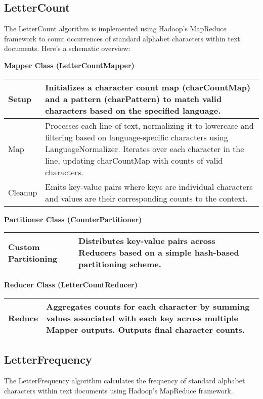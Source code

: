 \subsection{LetterCount}

The LetterCount algorithm is implemented using Hadoop's MapReduce framework to count occurrences of standard alphabet characters within text documents. Here’s a schematic overview:


\textbf{Mapper Class (LetterCountMapper)}
\begin{longtable}{|>{\raggedright\arraybackslash}p{}|>{\raggedright\arraybackslash}p{}|}
    \hline
    Setup & Initializes a character count map (charCountMap) and a pattern (charPattern) to match valid characters based on the specified language. \\
    \hline
    Map & Processes each line of text, normalizing it to lowercase and filtering based on language-specific characters using LanguageNormalizer. Iterates over each character in the line, updating charCountMap with counts of valid characters. \\
    \hline
    Cleanup & Emits key-value pairs where keys are individual characters and values are their corresponding counts to the context. \\
    \hline
\end{longtable}

\textbf{Partitioner Class (CounterPartitioner)}
\begin{longtable}{|>{\raggedright\arraybackslash}p{}|>{\raggedright\arraybackslash}p{}|}
    \hline
    Custom Partitioning & Distributes key-value pairs across Reducers based on a simple hash-based partitioning scheme. \\
    \hline
\end{longtable}

\textbf{Reducer Class (LetterCountReducer)}
\begin{longtable}{|>{\raggedright\arraybackslash}p{}|>{\raggedright\arraybackslash}p{}|}
    \hline
    Reduce & Aggregates counts for each character by summing values associated with each key across multiple Mapper outputs. Outputs final character counts. \\
    \hline
\end{longtable}








\subsection{LetterFrequency}
The LetterFrequency algorithm calculates the frequency of standard alphabet characters within text documents using Hadoop's MapReduce framework.


